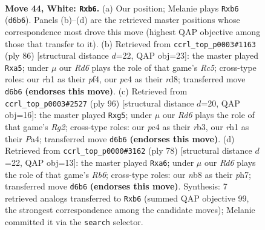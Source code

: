 \documentclass[11pt]{article}
\begin{document}
\clearpage

\begin{figure}[p]\centering
\begin{subfigure}{0.46\textwidth}\centering
\resizebox{\linewidth}{!}{%
\newchessgame
\chessboard[
  setfen={1n2k3/8/1p1R4/1P1P4/p1p3P1/8/1PK5/7r w - - 3 44},
  showmover=false,
  pgfstyle=straightmove, color=movearrow, markmove={d6-b6}
]}
\caption{}
\end{subfigure}\hfill
\begin{subfigure}{0.46\textwidth}\centering
\resizebox{\linewidth}{!}{%
\newchessgame
\chessboard[
  setfen={3r4/8/6k1/p1R5/P4p1p/2P2P2/1PK5/8 w - - 2 44},
  showmover=false,
  pgfstyle=straightmove, color=movearrow, markmove={c5-a5}
]}
\caption{}
\end{subfigure}
\\[4pt]
\begin{subfigure}{0.46\textwidth}\centering
\resizebox{\linewidth}{!}{%
\newchessgame
\chessboard[
  setfen={8/8/4k3/p5p1/P1PK1p2/1r6/6RP/8 w - - 0 49},
  showmover=false,
  pgfstyle=straightmove, color=movearrow, markmove={g2-g5}
]}
\caption{}
\end{subfigure}\hfill
\begin{subfigure}{0.46\textwidth}\centering
\resizebox{\linewidth}{!}{%
\newchessgame
\chessboard[
  setfen={8/7p/pR6/5pk1/8/1P2PK1P/8/2r5 w - - 2 40},
  showmover=false,
  pgfstyle=straightmove, color=movearrow, markmove={b6-a6}
]}
\caption{}
\end{subfigure}
\caption{\textbf{Move 44, White: \texttt{Rxb6}.} (a) Our position; Melanie plays \texttt{Rxb6} (\texttt{d6b6}). Panels (b)--(d) are the retrieved master positions whose correspondence most drove this move (highest QAP objective among those that transfer to it). (b) Retrieved from \texttt{ccrl\_top\_p0003\#1163} (ply 86) [structural distance $d$=22, QAP obj=23]: the master played \texttt{Rxa5}; under $\mu$ our \emph{Rd6} plays the role of that game's \emph{Rc5}; cross-type roles: our \emph{r}h1 as their \emph{p}f4, our \emph{p}c4 as their \emph{r}d8; transferred move \texttt{d6b6} \textbf{(endorses this move)}. (c) Retrieved from \texttt{ccrl\_top\_p0003\#2527} (ply 96) [structural distance $d$=20, QAP obj=16]: the master played \texttt{Rxg5}; under $\mu$ our \emph{Rd6} plays the role of that game's \emph{Rg2}; cross-type roles: our \emph{p}c4 as their \emph{r}b3, our \emph{r}h1 as their \emph{P}a4; transferred move \texttt{d6b6} \textbf{(endorses this move)}. (d) Retrieved from \texttt{ccrl\_top\_p0000\#3162} (ply 78) [structural distance $d$=22, QAP obj=13]: the master played \texttt{Rxa6}; under $\mu$ our \emph{Rd6} plays the role of that game's \emph{Rb6}; cross-type roles: our \emph{n}b8 as their \emph{p}h7; transferred move \texttt{d6b6} \textbf{(endorses this move)}. Synthesis: 7 retrieved analogs transferred to \texttt{Rxb6} (summed QAP objective 99, the strongest correspondence among the candidate moves); Melanie committed it via the \texttt{search} selector.}
\label{fig:thought-m86}
\end{figure}
\end{document}
